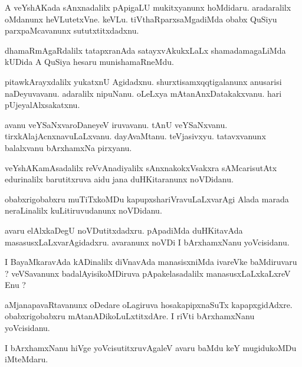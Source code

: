\documentclass{article}
\begin{document}
\begin{mn}%
A veYshAKada sAnxnadalilx pApigaLU mukitxyanunx hoMdidaru. aradaralilx oMdanunx 
heVLutetxVne. keVLu. tiVthaRparxsaMgadiMda obabx QuSiyu parxpaMcavanunx sututxtitxdadxnu.
\end{mn}

\begin{mn}%
dhamaRmAgaRdalilx tatapxranAda satayxvAkukxLaLx shamadamagaLiMda kUDida A QuSiya hesaru 
munishamaRneMdu. 
\end{mn}

\begin{mn}%
pitawkArayxdalilx yukatxnU Agidadxnu. shurxtisamxqqtigalanunx anusarisi naDeyuvavanu. 
adaralilx nipuNanu. oLeLxya mAtanAnxDatakakxvanu. hari pUjeyalAlxsakatxnu.
\end{mn}

\begin{mn}%
avanu veYSaNxvaroDaneyeV iruvavanu. tAnU veYSaNxvanu. tirxkAlajAcnxnavuLaLxvanu. 
dayAvaMtanu. teVjasivxyu. tatavxvanunx balalxvanu bArxhamxNa pirxyanu.
\end{mn}

\begin{mn}%
veYshAKamAsadalilx reVvAnadiyalilx sAnxnakokxVsakxra sAMcarisutAtx edurinalilx 
barutitxruva aidu jana duHKitaranunx noVDidanu.
\end{mn}

\begin{mn}%
obabxrigobabxru muTiTxkoMDu kapupxshariVravuLaLxvarAgi Alada marada neraLinalilx 
kuLitiruvudanunx noVDidanu.
\end{mn}

\begin{mn}%
avaru elAlxkaDegU noVDutitxdadxru. pApadiMda duHKitavAda masasusxLaLxvarAgidadxru. 
avaranunx noVDi I bArxhamxNanu yoVcisidanu.
\end{mn}

\begin{mn}%
I BayaMkaravAda kADinalilx diVnavAda manasisxniMda ivareVke baMdiruvaru ? veVSavanunx 
badalAyisikoMDiruva pApakelasadalilx manasusxLaLxkaLxreV Enu ?
\end{mn}

\begin{mn}%
aMjanapavaRtavanunx oDedare oLagiruva hosakapipxnaSuTx kapapxgidAdxre. obabxrigobabxru 
mAtanADikoLuLxtitxdAre. I riVti bArxhamxNanu yoVcisidanu.
\end{mn}

\begin{mn}%
I bArxhamxNanu hiVge yoVcisutitxruvAgaleV avaru baMdu keY mugidukoMDu iMteMdaru.
\end{mn}
\end{document}
